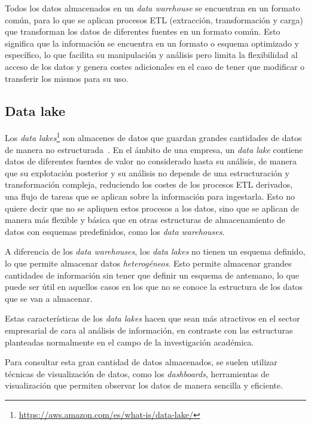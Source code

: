 Todos los datos almacenados en un \textit{data warehouse} se encuentran en un
formato común, para lo que se aplican procesos ETL (extracción, transformación y
carga) que transforman los datos de diferentes fuentes en un formato común. Esto
significa que la información se encuentra en un formato o esquema optimizado y
específico, lo que facilita su manipulación y análisis pero limita la
flexibilidad al acceso de los datos y genera costes adicionales en el caso de
tener que modificar o transferir los mismos para su uso.


\subsection{Data lake}\label{sec:lake}
Los \textit{data lakes}\footnote{
	\url{https://aws.amazon.com/es/what-is/data-lake/}
} son almacenes de datos que guardan grandes cantidades de datos de manera no
estructurada~\cite{mier2023dashboards}. En el ámbito de una empresa, un
\textit{data lake} contiene datos de diferentes fuentes de valor no considerado
hasta su análisis, de manera que su explotación posterior y su análisis no
depende de una estructuración y transformación compleja, reduciendo los costes
de los procesos ETL derivados, una flujo de tareas que se aplican sobre la
información para ingestarla. Esto no quiere decir que no se apliquen estos
procesos a los datos, sino que se aplican de manera más flexible y básica que en
otras estructuras de almacenamiento de datos con esquemas predefinidos, como los
\textit{data warehouses}.~\cite{pwint2018data}

A diferencia de los \textit{data warehouses}, los \textit{data lakes} no tienen
un esquema definido, lo que permite almacenar datos \textit{heterogéneos}. Esto
permite almacenar grandes cantidades de información sin tener que definir un
esquema de antemano, lo que puede ser útil en aquellos casos en los que no se
conoce la estructura de los datos que se van a almacenar.

Estas características de los \textit{data lakes} hacen que sean más atractivos
en el sector empresarial de cara al análisis de información, en contraste con
las estructuras planteadas normalmente en el campo de la investigación
académica.

Para consultar esta gran cantidad de datos almacenados, se suelen utilizar
técnicas de visualización de datos, como los \textit{dashboards}, herramientas
de visualización que permiten observar los datos de manera sencilla y eficiente.


